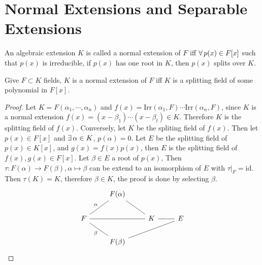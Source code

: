 \section{Normal Extensions and Separable Extensions}
\begin{definition}
    An algebraic extension $K$ is called a normal extension of $F$ iff $\forall\, p(x)\in F[x]$ such that $p(x)$ is irreducible, if $p(x)$ has one root in $K$, then $p(x)$ splits over $K$.
\end{definition}
\begin{proposition}
    Give $F\subset K$ fields, $K$ is a normal extension of $F$ iff $K$ is a splitting field of some polynomial in $F[x]$.
\end{proposition}
\begin{proof}
    Let $K=F(\alpha_1,\cdots,\alpha_n)$ and $f(x)=\mathrm{Irr}(\alpha_1,F)\cdots \mathrm{Irr}(\alpha_n,F)$, since $K$ is a normal extension $f(x)=(x-\beta_1)\cdots(x-\beta_t)\in K$. Therefore $K$ is the splitting field of $f(x)$. Conversely, let $K$ be the spliting field of $f(x)$. Then let $p(x)\in F[x]$ and $\exists\,\alpha\in K$, $p(\alpha)=0$. Let $E$ be the splitting field of $p(x)\in K[x]$, and $g(x)=f(x)p(x)$, then $E$ is the splitting field of $f(x),g(x)\in F[x]$. Let $\beta\in E$ a root of $p(x)$, Then $\tau:F(\alpha)\to F(\beta),\alpha\mapsto\beta$ can be extend to an isomorphism of $E$ with $\tau|_F=\mathrm{id}$. Then $\tau(K)=K$, therefore $\beta\in K$, the proof is done by selecting $\beta$.
    \[\begin{tikzcd}
        & {F(\alpha)} \\
        F && K & E \\
        & {F(\beta)}
        \arrow["\alpha"', no head, from=1-2, to=2-1]
        \arrow["\beta"', no head, from=2-1, to=3-2]
        \arrow[no head, from=2-3, to=2-1]
        \arrow[no head, from=2-3, to=2-4]
        \arrow[no head, from=3-2, to=2-4]
        \arrow[no head, from=1-2, to=2-3]
    \end{tikzcd}\]
\end{proof}
